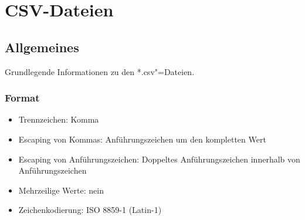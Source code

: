 \chapter{CSV-Dateien}\label{chap:csvfiles}

\section{Allgemeines}\label{sec:csvfiles/general}

Grundlegende Informationen zu den *.csv"=Dateien.

\subsection{Format}

\begin{itemize}
\item Trennzeichen: Komma
\item Escaping von Kommas: Anführungszeichen um den kompletten Wert
\item Escaping von Anführungszeichen: Doppeltes Anführungszeichen innerhalb von Anführungszeichen
\item Mehrzeilige Werte: nein
\item Zeichenkodierung: ISO 8859-1 (Latin-1)
\end{itemize}
